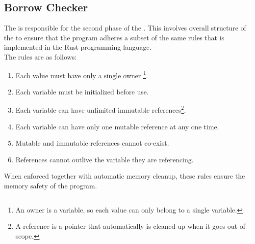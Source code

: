 \subsection{Borrow Checker}

The \borrowChecker{} is responsible for the second phase of the \static. 
This involves overall structure of the \ast{} to ensure that the program
adheres a subset of the same rules that is implemented in the Rust programming
language\cite{RUST}. \\

The rules are as follows:

\begin{enumerate} 
  \item Each value must have only a single owner \footnote{An owner is a variable, so
    each value can only belong to a single variable.}. 
  
  \item Each variable must be initialized before use. 

  \item Each variable can have unlimited immutable references\footnote{A reference is
    a pointer that automatically is cleaned up when it goes out of scope.}.

  \item Each variable can have only one mutable reference at any one time. 

  \item Mutable and immutable references cannot co-exist. 

  \item References cannot outlive the variable they are referencing.
\end{enumerate}

When enforced together with automatic memory cleanup, these rules ensure the memory
safety of the program. 
